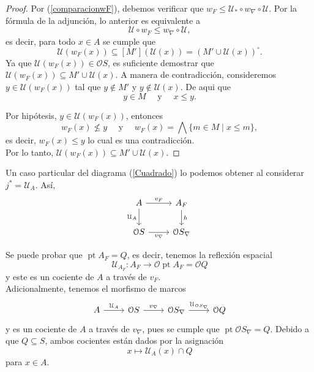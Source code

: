 \documentclass[11pt]{amsart}
\DeclareMathOperator{\pt}{pt}
\theoremstyle{plain}
\theoremstyle{definition}
\begin{document}
\begin{proof}
Por (\ref{comparacionwF}), debemos verificar que $w_F\leq \mathcal{U}_*\circ w_\nabla\circ \mathcal{U}$. Por la fórmula de la adjunción,
lo anterior es equivalente a 
\[
\mathcal{U}\circ w_F\leq w_\nabla\circ \mathcal{U},
\]
es decir, para todo $x\in A$ se cumple que 
\[
\mathcal{U}(w_F(x))\subseteq [M'](\mathcal{U}(x))=(M'\cup \mathcal{U}(x))^\circ.
\]
Ya que $\mathcal{U}(w_F(x))\in \mathcal{O}S$, es suficiente demostrar que $\mathcal{U}(w_F(x))\subseteq M'\cup \mathcal{U}(x)$.
A manera de contradicción, consideremos $y\in \mathcal{U}(w_F(x))$ tal que $y\notin M'$ y $y\notin \mathcal{U}(x)$. De aqui que
\[
y\in M\quad\text{ y }\quad x\leq y.
\]

Por hipótesis, $y\in \mathcal{U}(w_F(x))$, entonces 
\[
w_F(x)\nleq y\quad \text{ y }\quad w_F(x)=\bigwedge\{m\in M\mid x\leq m\},
\]
es decir, $w_F(x)\leq y$ lo cual es una contradicción.\\ 

Por lo tanto, $\mathcal{U}(w_F(x))\subseteq M'\cup \mathcal{U}(x)$.
\end{proof}

Un caso particular del diagrama (\ref{Cuadrado}) lo podemos obtener al considerar $j^*=\mathcal{U}_A$. Así,
\[\begin{tikzcd}
	A & {A_F} \\
	{\mathcal{O}S} & {\mathcal{O}S_\nabla}
	\arrow["{v_F}", from=1-1, to=1-2]
	\arrow["{\mathcal{U}_A}"', from=1-1, to=2-1]
	\arrow["h", from=1-2, to=2-2]
	\arrow["{v_\nabla}"', from=2-1, to=2-2]
\end{tikzcd}\]

Se puede probar que $\pt A_F=Q$, es decir, tenemos la reflexión espacial
\[
\mathcal{U}_{A_F}\colon A_F\to \mathcal{O}\pt A_F=\mathcal{O}Q
\]
y este es un cociente de $A$ a través de $v_F$.\\ 

Adicionalmente, tenemos el morfismo de marcos
\[\begin{tikzcd}
	A & {\mathcal{O}S} & {\mathcal{O}S_\nabla} & {\mathcal{O}Q}
	\arrow["{\mathcal{U}_A}", from=1-1, to=1-2]
	\arrow["{v_\nabla}", from=1-2, to=1-3]
	\arrow["{\mathcal{U}_{\mathcal{O}S_\nabla}}", from=1-3, to=1-4]
\end{tikzcd}\]
y es un cociente de $A$ a través de $v_\nabla$, pues se cumple que $\pt \mathcal{O}S_\nabla=Q$. Debido a que $Q\subseteq S$, ambos cocientes están dados por la asignación
\[
x\mapsto \mathcal{U}_A(x)\cap Q
\]
para $x\in A$. 
\end{document}
